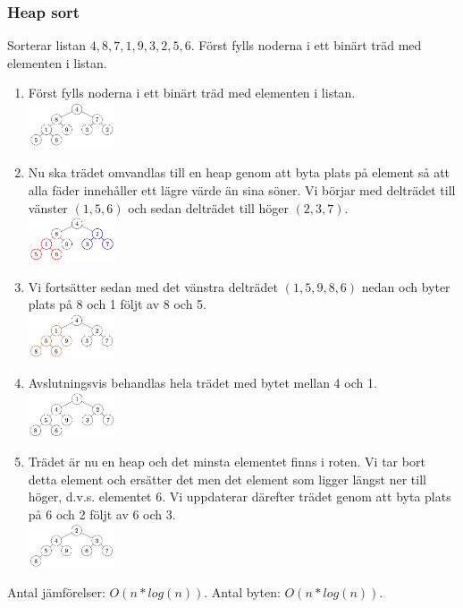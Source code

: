 \documentclass{article}
\begin{document}
\begin{multicols}{2}
\subsubsection{Heap sort}
Sorterar listan $4,8,7,1,9,3,2,5,6$. Först fylls noderna i ett binärt träd med elementen i listan.
\begin{multicols}{2}
    \begin{enumerate}
        \item Först fylls noderna i ett binärt träd med elementen i listan.\\
        \includegraphics[width=0.2\textwidth]{heap1}
        \item Nu ska trädet omvandlas till en heap genom att byta plats på element så att alla fäder innehåller ett lägre värde än sina söner. Vi börjar med delträdet till vänster $(1,5,6)$ och sedan delträdet till höger $(2,3,7)$.\\
        \includegraphics[width=0.2\textwidth]{heap2}
        \item Vi fortsätter sedan med det vänstra delträdet $(1,5,9,8,6)$ nedan och byter plats på 8 och 1 följt av 8 och 5.\\
        \includegraphics[width=0.2\textwidth]{heap3}
        \item Avslutningsvis behandlas hela trädet med bytet mellan 4 och 1.\\
        \includegraphics[width=0.2\textwidth]{heap4}
        \item Trädet är nu en heap och det minsta elementet finns i roten. Vi tar bort detta element och ersätter det men det element som ligger längst ner till höger, d.v.s. elementet 6. Vi uppdaterar därefter trädet genom att byta plats på 6 och 2 följt av 6 och 3.\\
        \includegraphics[width=0.2\textwidth]{heap5}
    \end{enumerate}
    Antal jämförelser: $O(n*log(n))$. Antal byten: $O(n*log(n))$.
\end{multicols}


\end{multicols}
\end{document}
